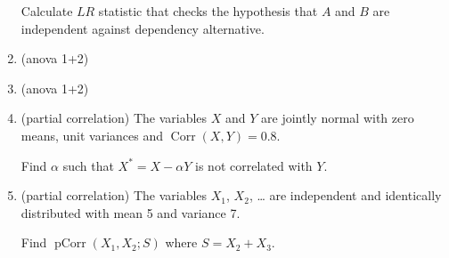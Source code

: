 \documentclass[12pt]{article}
\DeclareMathOperator{\Corr}{Corr}
\DeclareMathOperator{\pCorr}{pCorr}
\begin{document}
\begin{enumerate}
    Calculate $LR$ statistic that checks the hypothesis that $A$ and $B$ are independent against dependency alternative. 

    \item (anova 1+2)
    \item (anova 1+2)

    \item (partial correlation) The variables $X$ and $Y$ are jointly normal with zero means,
unit variances and $\Corr(X, Y) = 0.8$. 

Find $\alpha$ such that $X^* = X - \alpha Y$ is not correlated with $Y$. 

\item (partial correlation) The variables $X_1$, $X_2$, \ldots{ } are independent and identically distributed with mean 5 and variance 7. 

Find $\pCorr(X_1, X_2; S)$ where $S = X_2 + X_3$.
    
    
\end{enumerate}
\end{document}
